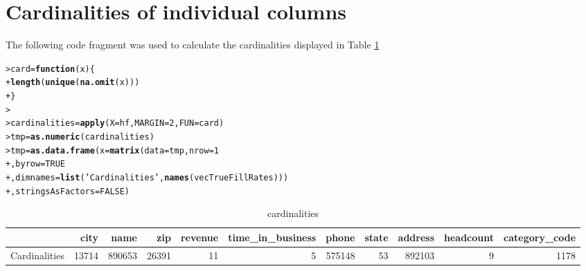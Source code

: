 \documentclass[12pt]{article}\usepackage[]{graphicx}\usepackage[]{color}
\makeatletter
\newcommand{\hlnum}[1]{\textcolor[rgb]{0.686,0.059,0.569}{#1}}%
\newcommand{\hlstr}[1]{\textcolor[rgb]{0.192,0.494,0.8}{#1}}%
\newcommand{\hlstd}[1]{\textcolor[rgb]{0.345,0.345,0.345}{#1}}%
\newcommand{\hlkwa}[1]{\textcolor[rgb]{0.161,0.373,0.58}{\textbf{#1}}}%
\newcommand{\hlkwb}[1]{\textcolor[rgb]{0.69,0.353,0.396}{#1}}%
\newcommand{\hlkwc}[1]{\textcolor[rgb]{0.333,0.667,0.333}{#1}}%
\newcommand{\hlkwd}[1]{\textcolor[rgb]{0.737,0.353,0.396}{\textbf{#1}}}%
\newenvironment{kframe}{%
 \def\at@end@of@kframe{}%
 \ifinner\ifhmode%
  \def\at@end@of@kframe{\end{minipage}}%
  \begin{minipage}{\columnwidth}%
 \fi\fi%
 \def\FrameCommand##1{\hskip\@totalleftmargin \hskip-\fboxsep
 \colorbox{shadecolor}{##1}\hskip-\fboxsep
     \hskip-\linewidth \hskip-\@totalleftmargin \hskip\columnwidth}%
 \MakeFramed {\advance\hsize-\width
   \@totalleftmargin\z@ \linewidth\hsize
   \@setminipage}}%
 {\par\unskip\endMakeFramed%
 \at@end@of@kframe}
\newenvironment{knitrout}{}{} %
\makeatother
\begin{document}
\section{Cardinalities of individual columns}
The following code fragment was used to calculate the cardinalities displayed in Table \ref{tbl:card}
\begin{knitrout}\footnotesize
{}\color{fgcolor}\begin{kframe}
\begin{alltt}
\hlstd{> }\hlstd{card} \hlkwb{=} \hlkwa{function} \hlstd{(}\hlkwc{x}\hlstd{) \{}
\hlstd{+ }  \hlkwd{length} \hlstd{(}\hlkwd{unique} \hlstd{(}\hlkwd{na.omit} \hlstd{(x)))}
\hlstd{+ }\hlstd{\}}
\hlstd{> }
\hlstd{> }\hlstd{cardinalities} \hlkwb{=} \hlkwd{apply} \hlstd{(}\hlkwc{X}\hlstd{=hf,} \hlkwc{MARGIN} \hlstd{=} \hlnum{2}\hlstd{,} \hlkwc{FUN} \hlstd{= card)}
\hlstd{> }\hlstd{tmp} \hlkwb{=} \hlkwd{as.numeric} \hlstd{(cardinalities)}
\hlstd{> }\hlstd{tmp} \hlkwb{=} \hlkwd{as.data.frame} \hlstd{(}\hlkwc{x}\hlstd{=}\hlkwd{matrix} \hlstd{(}\hlkwc{data}\hlstd{=tmp,} \hlkwc{nrow} \hlstd{=} \hlnum{1}
\hlstd{+ }                      \hlstd{,} \hlkwc{byrow} \hlstd{=} \hlnum{TRUE}
\hlstd{+ }                      \hlstd{,} \hlkwc{dimnames} \hlstd{=} \hlkwd{list} \hlstd{(}\hlstr{'Cardinalities'}\hlstd{,} \hlkwd{names} \hlstd{(vecTrueFillRates)))}
\hlstd{+ }            \hlstd{,} \hlkwc{stringsAsFactors} \hlstd{=} \hlnum{FALSE}\hlstd{)}
\end{alltt}
\end{kframe}
\end{knitrout}
\begin{table}[htb]
\begin{center}
{\tiny

\begin{tabular}{l|r|r|r|r|r|r|r|r|r|r}
\hline
  & city & name & zip & revenue & time\_in\_business & phone & state & address & headcount & category\_code\\
\hline
Cardinalities & 13714 & 890653 & 26391 & 11 & 5 & 575148 & 53 & 892103 & 9 & 1178\\
\hline
\end{tabular}

}
\end{center}
\label{tbl:card}
\caption{\small cardinalities}
\end{table}
\end{document}
